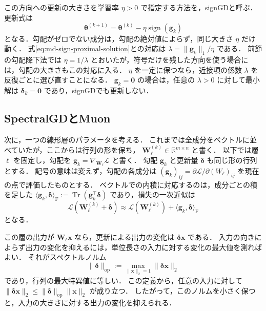 \documentclass[../main.tex]{subfiles}
\begin{document}
この方向への更新の大きさを学習率 $\eta>0$ で指定する方法を，signGDと呼ぶ．
更新式は
\begin{equation}
  \bm{\theta}^{(k+1)}
  =\bm{\theta}^{(k)}-\eta\operatorname{sign}(\bm{g}_k)
  \label{eq:md-sign-gd}
\end{equation}
となる．勾配がゼロでない成分は，勾配の絶対値によらず，同じ大きさ $\eta$ だけ動く．
式\eqref{eq:md-sign-proximal-solution}との対応は
$\lambda=\|\bm{g}_k\|_1/\eta$ である．
前節の勾配降下法では $\eta=1/\lambda$ とおいたが，符号だけを残した方向を使う場合には，勾配の大きさもこの対応に入る．
$\eta$ を一定に保つなら，近接項の係数 $\lambda$ を反復ごとに選び直すことになる．
$\bm{g}_k=\bm{0}$ の場合は，任意の $\lambda>0$ に対して最小解は $\bm{\delta}_k=\bm{0}$ であり，signGDでも更新しない．

\subsection{SpectralGDとMuon}
\label{subsec:md-muon}

次に，一つの線形層のパラメータを考える．
これまでは全成分をベクトルに並べていたが，ここからは行列の形を保ち，
$\bm{W}_\ell^{(k)}\in\mathbb{R}^{m\times n}$ と書く．
以下では層 $\ell$ を固定し，勾配を $\bm{g}_k=\nabla_{\bm{W}_\ell}\mathcal{L}$ と書く．
勾配 $\bm{g}_k$ と更新量 $\bm{\delta}$ も同じ形の行列とする．
記号の意味は変えず，勾配の各成分は
$(\bm{g}_k)_{ij}=\partial\mathcal{L}/\partial(W_\ell)_{ij}$ を現在の点で評価したものとする．
ベクトルでの内積に対応するのは，成分ごとの積を足した
$\langle\bm{g}_k,\bm{\delta}\rangle_{\mathrm F}
:=\operatorname{Tr}(\bm{g}_k^\top\bm{\delta})$ であり，損失の一次近似は
\begin{equation}
  \mathcal{L}(\bm{W}_\ell^{(k)}+\bm{\delta})
  \approx\mathcal{L}(\bm{W}_\ell^{(k)})
  +\langle\bm{g}_k,\bm{\delta}\rangle_{\mathrm F}
  \label{eq:md-matrix-linear-loss}
\end{equation}
となる．

この層の出力が $\bm{W}_\ell\bm{x}$ なら，更新による出力の変化は $\bm{\delta}\bm{x}$ である．
入力の向きによらず出力の変化を抑えるには，単位長さの入力に対する変化の最大値を測ればよい．
それがスペクトルノルム
\begin{equation}
  \|\bm{\delta}\|_{\mathrm{op}}
  :=\max_{\|\bm{x}\|_2=1}\|\bm{\delta}\bm{x}\|_2
  \label{eq:md-spectral-norm}
\end{equation}
であり，行列の最大特異値に等しい．
この定義から，任意の入力に対して
$\|\bm{\delta}\bm{x}\|_2\leq\|\bm{\delta}\|_{\mathrm{op}}\|\bm{x}\|_2$ が成り立つ．
したがって，このノルムを小さく保つと，入力の大きさに対する出力の変化を抑えられる．
\end{document}
